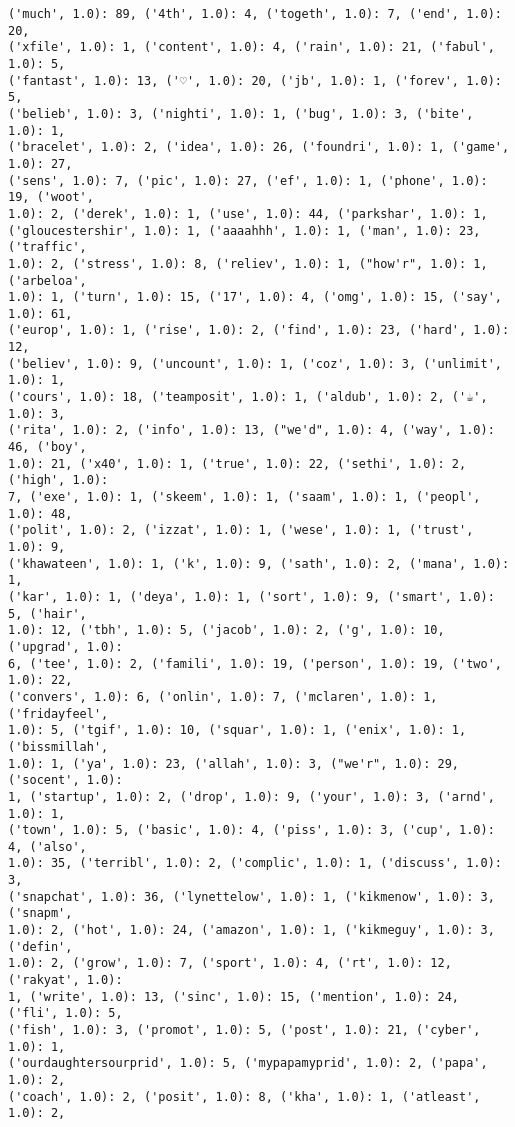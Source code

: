 \documentclass[11pt]{article}
\begin{document}
\begin{Verbatim}[commandchars=\\\{\}]
('much', 1.0): 89, ('4th', 1.0): 4, ('togeth', 1.0): 7, ('end', 1.0): 20,
('xfile', 1.0): 1, ('content', 1.0): 4, ('rain', 1.0): 21, ('fabul', 1.0): 5,
('fantast', 1.0): 13, ('♡', 1.0): 20, ('jb', 1.0): 1, ('forev', 1.0): 5,
('belieb', 1.0): 3, ('nighti', 1.0): 1, ('bug', 1.0): 3, ('bite', 1.0): 1,
('bracelet', 1.0): 2, ('idea', 1.0): 26, ('foundri', 1.0): 1, ('game', 1.0): 27,
('sens', 1.0): 7, ('pic', 1.0): 27, ('ef', 1.0): 1, ('phone', 1.0): 19, ('woot',
1.0): 2, ('derek', 1.0): 1, ('use', 1.0): 44, ('parkshar', 1.0): 1,
('gloucestershir', 1.0): 1, ('aaaahhh', 1.0): 1, ('man', 1.0): 23, ('traffic',
1.0): 2, ('stress', 1.0): 8, ('reliev', 1.0): 1, ("how'r", 1.0): 1, ('arbeloa',
1.0): 1, ('turn', 1.0): 15, ('17', 1.0): 4, ('omg', 1.0): 15, ('say', 1.0): 61,
('europ', 1.0): 1, ('rise', 1.0): 2, ('find', 1.0): 23, ('hard', 1.0): 12,
('believ', 1.0): 9, ('uncount', 1.0): 1, ('coz', 1.0): 3, ('unlimit', 1.0): 1,
('cours', 1.0): 18, ('teamposit', 1.0): 1, ('aldub', 1.0): 2, ('☕', 1.0): 3,
('rita', 1.0): 2, ('info', 1.0): 13, ("we'd", 1.0): 4, ('way', 1.0): 46, ('boy',
1.0): 21, ('x40', 1.0): 1, ('true', 1.0): 22, ('sethi', 1.0): 2, ('high', 1.0):
7, ('exe', 1.0): 1, ('skeem', 1.0): 1, ('saam', 1.0): 1, ('peopl', 1.0): 48,
('polit', 1.0): 2, ('izzat', 1.0): 1, ('wese', 1.0): 1, ('trust', 1.0): 9,
('khawateen', 1.0): 1, ('k', 1.0): 9, ('sath', 1.0): 2, ('mana', 1.0): 1,
('kar', 1.0): 1, ('deya', 1.0): 1, ('sort', 1.0): 9, ('smart', 1.0): 5, ('hair',
1.0): 12, ('tbh', 1.0): 5, ('jacob', 1.0): 2, ('g', 1.0): 10, ('upgrad', 1.0):
6, ('tee', 1.0): 2, ('famili', 1.0): 19, ('person', 1.0): 19, ('two', 1.0): 22,
('convers', 1.0): 6, ('onlin', 1.0): 7, ('mclaren', 1.0): 1, ('fridayfeel',
1.0): 5, ('tgif', 1.0): 10, ('squar', 1.0): 1, ('enix', 1.0): 1, ('bissmillah',
1.0): 1, ('ya', 1.0): 23, ('allah', 1.0): 3, ("we'r", 1.0): 29, ('socent', 1.0):
1, ('startup', 1.0): 2, ('drop', 1.0): 9, ('your', 1.0): 3, ('arnd', 1.0): 1,
('town', 1.0): 5, ('basic', 1.0): 4, ('piss', 1.0): 3, ('cup', 1.0): 4, ('also',
1.0): 35, ('terribl', 1.0): 2, ('complic', 1.0): 1, ('discuss', 1.0): 3,
('snapchat', 1.0): 36, ('lynettelow', 1.0): 1, ('kikmenow', 1.0): 3, ('snapm',
1.0): 2, ('hot', 1.0): 24, ('amazon', 1.0): 1, ('kikmeguy', 1.0): 3, ('defin',
1.0): 2, ('grow', 1.0): 7, ('sport', 1.0): 4, ('rt', 1.0): 12, ('rakyat', 1.0):
1, ('write', 1.0): 13, ('sinc', 1.0): 15, ('mention', 1.0): 24, ('fli', 1.0): 5,
('fish', 1.0): 3, ('promot', 1.0): 5, ('post', 1.0): 21, ('cyber', 1.0): 1,
('ourdaughtersourprid', 1.0): 5, ('mypapamyprid', 1.0): 2, ('papa', 1.0): 2,
('coach', 1.0): 2, ('posit', 1.0): 8, ('kha', 1.0): 1, ('atleast', 1.0): 2,

\end{Verbatim}
\end{document}
